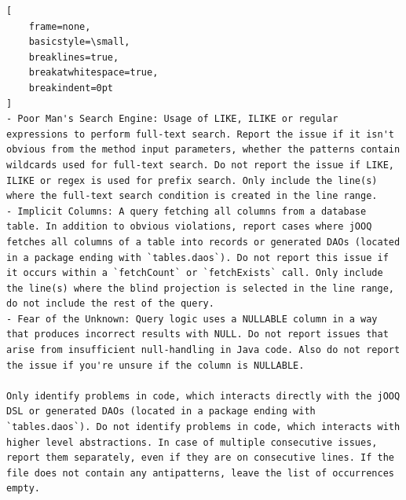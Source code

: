 \bigskip %
\bigskip %

\begingroup %
\captionsetup{type=figure}
{}\label{fig:dmlDqlInstructions}
\begin{lstlisting}[
    frame=none,
    basicstyle=\small,
    breaklines=true,
    breakatwhitespace=true,
    breakindent=0pt
]
- Poor Man's Search Engine: Usage of LIKE, ILIKE or regular expressions to perform full-text search. Report the issue if it isn't obvious from the method input parameters, whether the patterns contain wildcards used for full-text search. Do not report the issue if LIKE, ILIKE or regex is used for prefix search. Only include the line(s) where the full-text search condition is created in the line range.
- Implicit Columns: A query fetching all columns from a database table. In addition to obvious violations, report cases where jOOQ fetches all columns of a table into records or generated DAOs (located in a package ending with `tables.daos`). Do not report this issue if it occurs within a `fetchCount` or `fetchExists` call. Only include the line(s) where the blind projection is selected in the line range, do not include the rest of the query.
- Fear of the Unknown: Query logic uses a NULLABLE column in a way that produces incorrect results with NULL. Do not report issues that arise from insufficient null-handling in Java code. Also do not report the issue if you're unsure if the column is NULLABLE.

Only identify problems in code, which interacts directly with the jOOQ DSL or generated DAOs (located in a package ending with `tables.daos`). Do not identify problems in code, which interacts with higher level abstractions. In case of multiple consecutive issues, report them separately, even if they are on consecutive lines. If the file does not contain any antipatterns, leave the list of occurrences empty.
\end{lstlisting}

\nopagebreak
\begin{minipage}{\linewidth}
\end{minipage}
\par %
\endgroup %

